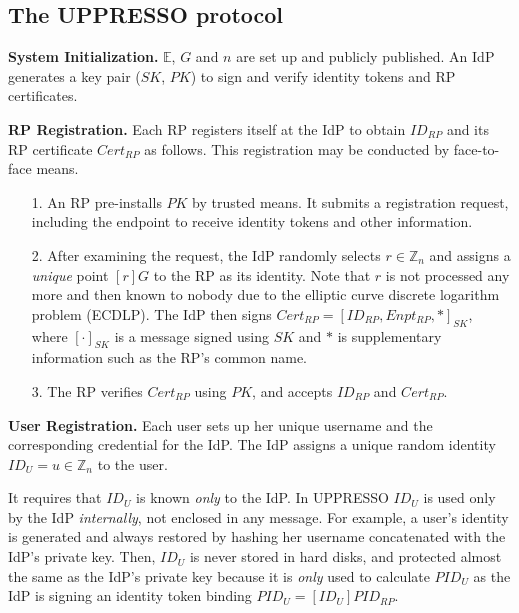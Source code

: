 \subsection{The UPPRESSO protocol}
\label{implementations}

\noindent \textbf{System Initialization.}
$\mathbb{E}$, $G$ and $n$ are set up and publicly published.
An IdP generates a key pair ($SK$, $PK$) to sign and verify identity tokens and RP certificates.


\noindent\textbf{RP Registration.}
Each RP registers itself at the IdP to obtain $ID_{RP}$ and its RP certificate $Cert_{RP}$ as follows.
This registration may be conducted by face-to-face means.
\begin{enumerate}
\setlength{\topsep}{0pt}
\setlength{\partopsep}{0pt}
\setlength{\itemsep}{0pt}
\setlength{\parsep}{0pt}
\setlength{\parskip}{0pt}
\item[1.]
An RP pre-installs $PK$ by trusted means.
It submits a registration request, including the endpoint to receive identity tokens and other information.
\item[2.]
After examining the request,
the IdP randomly selects $r \in \mathbb{Z}_n$
        and assigns a \emph{unique} point $[r]G$ to the RP as its identity.
Note that $r$ is not processed any more and then known to nobody
 due to the elliptic curve discrete logarithm problem (ECDLP).
The IdP then signs $Cert_{RP} = [ID_{RP}, Enpt_{RP}, *]_{SK}$,
     where $[\cdot]_{SK}$ is a message signed using $SK$ and $*$ is supplementary information such as the RP's common name.
\item[3.]
The RP verifies $Cert_{RP}$ using $PK$, and accepts $ID_{RP}$ and $Cert_{RP}$.
\end{enumerate}


\noindent\textbf{User Registration.}
Each user sets up her unique username and the corresponding credential for the IdP.
The IdP assigns
a unique random identity $ID_U = u\in \mathbb{Z}_n$ to the user.

It requires that $ID_U$ is known \emph{only} to the IdP.
In UPPRESSO $ID_U$ is used only by the IdP \emph{internally},
 not enclosed in any message.
For example, a user's identity is generated and always restored by hashing her username concatenated with the IdP's private key.
Then,
 $ID_U$ is never stored in hard disks,
 and protected almost the same as the IdP's private key
because it is \emph{only} used to calculate $PID_{U}$ as the IdP is signing an identity token binding $PID_{U}=
  [{ID_U}]{PID_{RP}}$.


